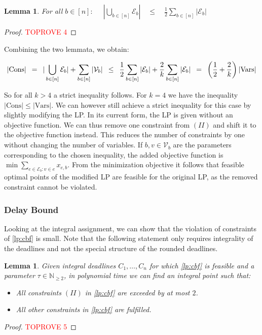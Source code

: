 \documentclass[11pt]{article}
\newcommand{\Hquad}{\hspace{0.5em}}
\newtheorem{lemma}[theorem]{Lemma}
\begin{document}
\begin{lemma}
For all $b \in [n]:$ $\quad|\bigcup_{b \in [n]}\mathcal{E}_b|\quad \le \quad \frac{1}{2}\sum_{b \in [n]}|\mathcal{E}_b|$
\end{lemma}
\begin{proof}\textcolor{red}{TOPROVE 4}\end{proof}

\noindent Combining the two lemmata, we obtain:

\begin{equation*}
    |\mathrm{Cons}| \Hquad=\Hquad |\bigcup_{b \in [n]} \mathcal{E}_b| + \sum_{b \in [n]}|\mathcal{V}_b|\Hquad \le\Hquad \frac{1}{2}\sum_{b \in [n]}|\mathcal{E}_b| + \frac{2}{k}\sum_{b \in [n]}|\mathcal{E}_b| \Hquad=\Hquad \left(\frac{1}{2} + \frac{2}{k}\right)|\mathrm{Vars}|
\end{equation*}

So for all $k > 4$ a strict inequality follows. For $k=4$ we have the inequality $|\mathrm{Cons}| \le |\mathrm{Vars}|$. We can however still achieve a strict inequality for this case by slightly modifying the LP. In its current form, the LP is given without an objective function. We can thus remove one constraint from $(II)$ and shift it to the objective function instead. This reduces the number of constraints by one without changing the number of variables. If $b, v \in \mathcal{V}_b$ are the parameters corresponding to the chosen inequality, the added objective function is $\min \sum_{e\in\mathcal{E}_b: v \in e}x_{e,b}$. From the minimization objective it follows that feasible optimal points of the modified LP are feasible for the original LP, as the removed constraint cannot be violated.

\subsubsection*{Delay Bound}
\noindent Looking at the integral assignment, we can show that the violation of constraints of \ref{lp:cbf} is small. Note that the following statement only requires integrality of the deadlines and not the special structure of the rounded deadlines.
\begin{lemma}\label{lemma:cbflpviolation}
Given integral deadlines $C_1,\dotsc,C_n$ for which \ref{lp:cbf} is feasible and a parameter $\tau \in \mathbb{N}_{\ge 2}$, in polynomial time we can find an integral point such that:
\begin{itemize}
    \item[a)] All constraints $(II)$ in \ref{lp:cbf} are exceeded by at most $2$.
    \item[b)] All other constraints in \ref{lp:cbf} are fulfilled.
\end{itemize}
\end{lemma}
\begin{proof}\textcolor{red}{TOPROVE 5}\end{proof}
\end{document}
